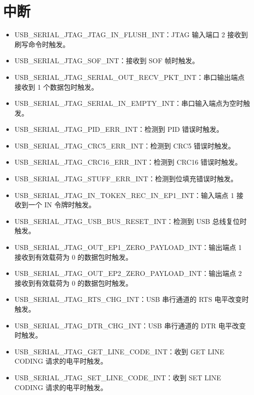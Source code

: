 \documentclass[main\_\_CN.tex]{subfiles}
\begin{document}
\section{中断}

\begin{itemize}
    \item \label{int:USBSERIALJTAGJTAGINFLUSHINT}USB\_SERIAL\_JTAG\_JTAG\_IN\_FLUSH\_INT：JTAG 输入端口 2 接收到刷写命令时触发。
    \item \label{int:USBSERIALJTAGSOFINT}USB\_SERIAL\_JTAG\_SOF\_INT：接收到 SOF 帧时触发。
    \item \label{int:USBSERIALJTAGSERIALOUTRECVPKTINT}USB\_SERIAL\_JTAG\_SERIAL\_OUT\_RECV\_PKT\_INT：串口输出端点接收到 1 个数据包时触发。
    \item \label{int:USBSERIALJTAGSERIALINEMPTYINT}USB\_SERIAL\_JTAG\_SERIAL\_IN\_EMPTY\_INT：串口输入端点为空时触发。
    \item \label{int:USBSERIALJTAGPIDERRINT}USB\_SERIAL\_JTAG\_PID\_ERR\_INT：检测到 PID 错误时触发。 
    \item \label{int:USBSERIALJTAGCRC5ERRINT}USB\_SERIAL\_JTAG\_CRC5\_ERR\_INT：检测到 CRC5 错误时触发。 
    \item \label{int:USBSERIALJTAGCRC16ERRINT}USB\_SERIAL\_JTAG\_CRC16\_ERR\_INT：检测到 CRC16 错误时触发。
    \item \label{int:USBSERIALJTAGSTUFFERRINT}USB\_SERIAL\_JTAG\_STUFF\_ERR\_INT：检测到位填充错误时触发。
    \item \label{int:USBSERIALJTAGINTOKENRECINEP1INT}USB\_SERIAL\_JTAG\_IN\_TOKEN\_REC\_IN\_EP1\_INT：输入端点 1 接收到一个 IN 令牌时触发。
    \item \label{int:USBSERIALJTAGUSBBUSRESETINT}USB\_SERIAL\_JTAG\_USB\_BUS\_RESET\_INT：检测到 USB 总线复位时触发。
    \item \label{int:USBSERIALJTAGOUTEP1ZEROPAYLOADINT}USB\_SERIAL\_JTAG\_OUT\_EP1\_ZERO\_PAYLOAD\_INT：输出端点 1 接收到有效载荷为 0 的数据包时触发。
    \item \label{int:USBSERIALJTAGOUTEP2ZEROPAYLOADINT}USB\_SERIAL\_JTAG\_OUT\_EP2\_ZERO\_PAYLOAD\_INT：输出端点 2 接收到有效载荷为 0 的数据包时触发。
    \item \label{int:USBSERIALJTAGRTSCHGINT}USB\_SERIAL\_JTAG\_RTS\_CHG\_INT：USB 串行通道的 RTS 电平改变时触发。
    \item \label{int:USBSERIALJTAGDTRCHGINT}USB\_SERIAL\_JTAG\_DTR\_CHG\_INT：USB 串行通道的 DTR 电平改变时触发。
    \item \label{int:USBSERIALJTAGGETLINECODEINT}USB\_SERIAL\_JTAG\_GET\_LINE\_CODE\_INT：收到 GET LINE CODING 请求的电平时触发。
    \item \label{int:USBSERIALJTAGSETLINECODEINT}USB\_SERIAL\_JTAG\_SET\_LINE\_CODE\_INT：收到 SET LINE CODING 请求的电平时触发。

\end{itemize}
\end{document}
